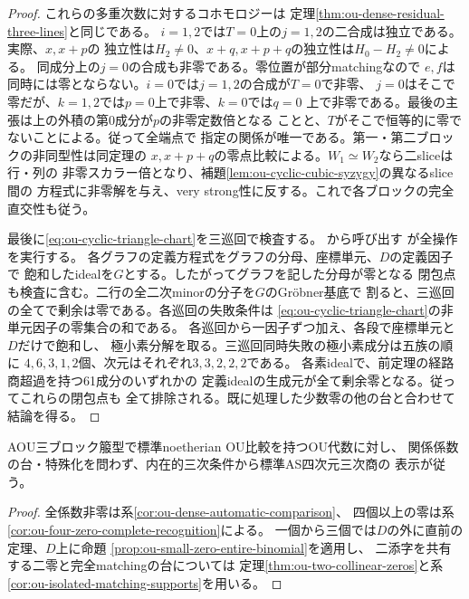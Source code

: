 \begin{proof}
これらの多重次数に対するコホモロジーは
定理\ref{thm:ou-dense-residual-three-lines}と同じである。
$i=1,2$では$T=0$上の$j=1,2$の二合成は独立である。実際、$x,x+p$の
独立性は$H_2\ne0$、$x+q,x+p+q$の独立性は$H_0-H_2\ne0$による。
同成分上の$j=0$の合成も非零である。零位置が部分matchingなので
$e,f$は同時には零とならない。$i=0$では$j=1,2$の合成が$T=0$で非零、
$j=0$はそこで零だが、$k=1,2$では$p=0$上で非零、$k=0$では$q=0$
上で非零である。最後の主張は上の外積の第0成分が$p$の非零定数倍となる
ことと、$T$がそこで恒等的に零でないことによる。従って全端点で
指定の関係が唯一である。第一・第二ブロックの非同型性は同定理の
$x,x+p+q$の零点比較による。$W_1\simeq W_2$なら二sliceは行・列の
非零スカラー倍となり、補題\ref{lem:ou-cyclic-cubic-syzygy}の異なるslice間の
方程式に非零解を与え、very strong性に反する。これで各ブロックの完全直交性も従う。

最後に\eqref{eq:ou-cyclic-triangle-chart}を三巡回で検査する。
から呼び出す
が全操作を実行する。
各グラフの定義方程式をグラフの分母、座標単元、$D$の定義因子で
飽和したidealを$G$とする。したがってグラフを記した分母が零となる
閉包点も検査に含む。二行の全二次minorの分子を$G$のGröbner基底で
割ると、三巡回の全てで剰余は零である。各巡回の失敗条件は
\eqref{eq:ou-cyclic-triangle-chart}の非単元因子の零集合の和である。
各巡回から一因子ずつ加え、各段で座標単元と$D$だけで飽和し、
極小素分解を取る。三巡回同時失敗の極小素成分は五族の順に
$4,6,3,1,2$個、次元はそれぞれ$3,3,2,2,2$である。
各素idealで、前定理の経路商超過を持つ61成分のいずれかの
定義idealの生成元が全て剰余零となる。従ってこれらの閉包点も
全て排除される。既に処理した少数零の他の台と合わせて結論を得る。
\end{proof}

\begin{corollary}[AOU三ブロック箙型の全関係係数]
\label{cor:ou-aou-all-coefficients}
AOU三ブロック箙型で標準noetherian OU比較を持つOU代数に対し、
関係係数の台・特殊化を問わず、内在的三次条件から標準AS四次元三次商の
表示が従う。
\end{corollary}
\begin{proof}
全係数非零は系\ref{cor:ou-dense-automatic-comparison}、
四個以上の零は系\ref{cor:ou-four-zero-complete-recognition}による。
一個から三個では$D$の外に直前の定理、$D$上に命題
\ref{prop:ou-small-zero-entire-binomial}を適用し、
二添字を共有する二零と完全matchingの台については
定理\ref{thm:ou-two-collinear-zeros}と系\ref{cor:ou-isolated-matching-supports}を用いる。
\end{proof}

